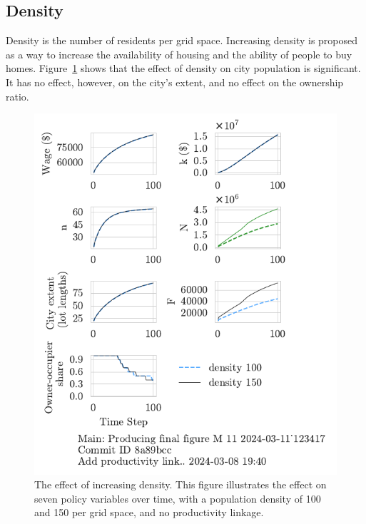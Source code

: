 

\newpage


\subsection{Density}
Density is the number of residents per grid space. Increasing density is proposed as a way to increase the availability of housing and the ability of people to buy homes. Figure~\ref{fig:density_ownership_trajectory} shows that the effect of density on city population is significant. It has no effect, however, on the city's extent, and no effect on the ownership ratio.


\begin{figure}[h!bt]
\centering
\includegraphics[scale=0.9, trim={0 1.4cm 0 0},clip]{fig/density-Main-123417.pdf}
\caption[The effect of increasing density]{The effect of increasing density. This figure illustrates the effect on seven policy variables over time, with a population density of 100 and 150 per grid space, and no productivity linkage.}
\label{fig:density_ownership_trajectory}
\end{figure}


